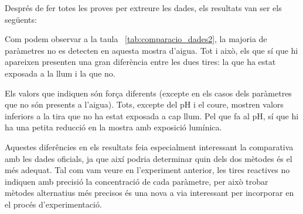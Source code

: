 Després de fer totes les proves per extreure les dades, els resultats van ser els següents:
\begin{table}[H]
\centering
{}
\caption{Resultats del experiment 2}

\label{tab:comparacio_dades2}
\end{table}

Com podem observar a la taula~ \ref{tab:comparacio_dades2}, la majoria de paràmetres no es detecten en aquesta mostra d’aigua. Tot i això, els que sí que hi apareixen presenten una gran diferència entre les dues tires: la que ha estat exposada a la llum i la que no.

Els valors que indiquen són força diferents (excepte en els casos dels paràmetres que no són presents a l’aigua). Tots, excepte del pH i el coure, mostren valors inferiors a la tira que no ha estat exposada a cap llum. Pel que fa al pH, sí que hi ha una petita reducció en la mostra amb exposició lumínica.

Aquestes diferêncies en els resultats feia especialment interessant la comparativa amb les dades oficials, ja que així podria determinar quin dels dos mètodes és el més adequat. Tal com vam veure en l’experiment anterior, les tires reactives no indiquen amb precisió la concentració de cada paràmetre, per això trobar mètodes alternatius més precisos és una nova a via interessant per incorporar en el procés d’experimentació.

